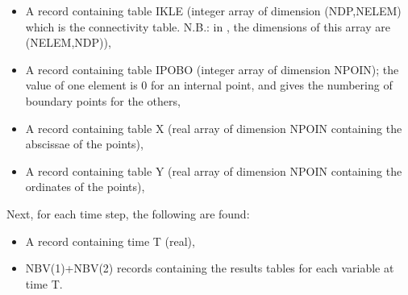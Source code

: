 \begin{itemize}
\item  A record containing table IKLE (integer array of dimension (NDP,NELEM) which is the connectivity table. N.B.: in , the dimensions of this array are (NELEM,NDP)),

\item  A record containing table IPOBO (integer array of dimension NPOIN); the value of one element is 0 for an internal point, and gives the numbering of boundary points for the others,

\item  A record containing table X (real array of dimension NPOIN containing the abscissae of the points),

\item  A record containing table Y (real array of dimension NPOIN containing the ordinates of the points),
\end{itemize}

 Next, for each time step, the following are found:

\begin{itemize}
\item  A record containing time T (real),

\item  NBV(1)+NBV(2) records containing the results tables for each variable at time T.
\end{itemize}

